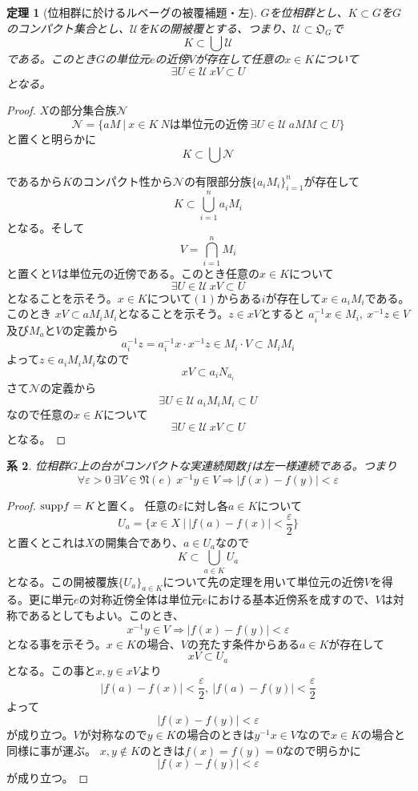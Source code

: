 \documentclass[leqno]{jsarticle}
\newtheorem{thm}{定理}
\newtheorem{cor}[thm]{系}
\newcommand{\To}{\Longrightarrow}
\newcommand{\ep}{\varepsilon}
\newcommand{\supp}{\text{{\rm supp}}}
\begin{document}
\begin{thm}[位相群に於けるルベーグの被覆補題・左]
$G$を位相群とし、$K\subset G$を$G$のコンパクト集合とし、$\mathcal{U}$を$K$の開被覆とする、つまり、$\mathcal{U}\subset \mathfrak{O}_{G}$で
\[
K\subset \bigcup \mathcal{U}
\]
である。このとき$G$の単位元$e$の近傍$V$が存在して任意の$x\in K$について
\[
\exists U\in \mathcal{U}\ xV\subset U
\]
となる。
\end{thm}

\begin{proof}$X$の部分集合族$\mathcal{N}$
\[
\mathcal{N}=\{aM\ |\ x\in K\ Nは単位元の近傍\ \exists U\in \mathcal{U}\ aMM\subset U\}
\]
と置くと明らかに
\[
K\subset \bigcup \mathcal{N}
\]

であるから$K$のコンパクト性から$\mathcal{N}$の有限部分族$\{a_iM_i\}_{i=1}^n$が存在して
\begin{equation}
K\subset \bigcup_{i=1}^{n}a_iM_i
\end{equation}
となる。そして
\[
V=\bigcap_{i=1}^nM_i
\]
と置くと$V$は単位元の近傍である。このとき任意の$x\in K$について
\[
\exists U\in \mathcal{U}\ xV \subset U
\]
となることを示そう。$x\in K$について$(1)$からある$i$が存在して$x\in a_iM_i$である。このとき
$xV\subset aM_iM_i$となることを示そう。$z\in xV$とすると
$a_i^{-1}x\in M_i,\ x^{-1}z\in V$及び$M_a$と$V$の定義から
\[
a_i^{-1}z= a_i^{-1}x\cdot x^{-1}z\in M_i\cdot V\subset M_iM_i
\]
よって$z\in a_iM_iM_i$なので
\[
xV\subset a_iN_{a_i}
\]
さて$\mathcal{N}$の定義から
\[
\exists U\in \mathcal{U}\ a_iM_iM_i\subset U
\]
なので任意の$x\in K$について
\[
\exists U\in \mathcal{U}\ xV\subset U
\]
となる。
\end{proof}
\begin{cor}
位相群$G$上の台がコンパクトな実連続関数$f$は左一様連続である。つまり
\[
\forall \ep >0\ \exists V\in \mathfrak{N}(e)\ x^{-1}y\in V \To |f(x)-f(y)|<\ep
\]
\end{cor}
\begin{proof}
$\supp f=K$と置く。
任意の$\ep$に対し各$a\in K$について
\[
U_a=\{x\in X\ |\ |f(a)-f(x)|<\frac{\ep}{2}\}
\]
と置くとこれは$X$の開集合であり、$a\in U_a$なので
\[
K\subset \bigcup_{a\in K}U_a
\]
となる。この開被覆族$\{U_a\}_{a\in K}$について先の定理を用いて単位元の近傍$V$を得る。更に単元$e$の対称近傍全体は単位元$e$における基本近傍系を成すので、$V$は対称であるとしてもよい。このとき、
\[
x^{-1}y\in V \To |f(x)-f(y)|<\ep
\]
となる事を示そう。$x\in K$の場合、$V$の充たす条件からある$a\in K$が存在して
\[
xV\subset U_a
\]
となる。この事と$x,y\in xV$より
\[
|f(a)-f(x)|<\frac{\ep}{2},\ |f(a)-f(y)|<\frac{\ep}{2}
\]よって
\[
|f(x)-f(y)|<\ep
\]
が成り立つ。$V$が対称なので$y\in K$の場合のときは$y^{-1}x\in V$なので$x\in K$の場合と同様に事が運ぶ。
$x,y\not\in K$のときは$f(x)=f(y)=0$なので明らかに
\[
|f(x)-f(y)|<\ep
\]が成り立つ。
\end{proof}
\end{document}
